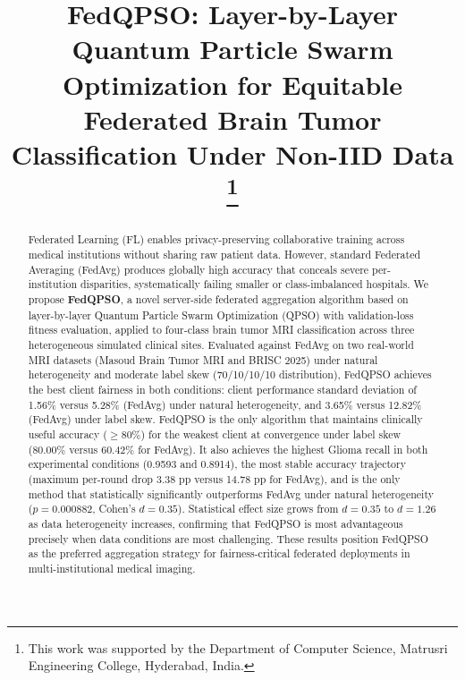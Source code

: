 \documentclass[conference]{IEEEtran}
\begin{document}

\title{FedQPSO: Layer-by-Layer Quantum Particle Swarm Optimization for
Equitable Federated Brain Tumor Classification Under Non-IID Data
\thanks{This work was supported by the Department of Computer Science,
Matrusri Engineering College, Hyderabad, India.}}

\author{%
}

\maketitle

\begin{abstract}
Federated Learning (FL) enables privacy-preserving collaborative training
across medical institutions without sharing raw patient data. However,
standard Federated Averaging (FedAvg) produces globally high accuracy that
conceals severe per-institution disparities, systematically failing smaller
or class-imbalanced hospitals. We propose \textbf{FedQPSO}, a novel
server-side federated aggregation algorithm based on layer-by-layer Quantum
Particle Swarm Optimization (QPSO) with validation-loss fitness evaluation,
applied to four-class brain tumor MRI classification across three
heterogeneous simulated clinical sites. Evaluated against FedAvg
on two real-world MRI datasets (Masoud Brain Tumor MRI and BRISC 2025) under
natural heterogeneity and moderate label skew (70/10/10/10 distribution),
FedQPSO achieves the best client fairness in both conditions: client
performance standard deviation of 1.56\% versus 5.28\%
(FedAvg) under natural heterogeneity, and 3.65\% versus 12.82\% (FedAvg) under label skew. FedQPSO is the only algorithm that
maintains clinically useful accuracy ($\geq$80\%) for the weakest client at
convergence under label skew (80.00\% versus 60.42\% for FedAvg). It also achieves the highest Glioma recall in both experimental
conditions (0.9593 and 0.8914), the most stable accuracy trajectory (maximum
per-round drop 3.38 pp versus 14.78 pp for FedAvg), and is the only method
that statistically significantly outperforms FedAvg under natural
heterogeneity ($p = 0.000882$, Cohen's $d = 0.35$). Statistical effect size
grows from $d = 0.35$ to $d = 1.26$ as data heterogeneity increases,
confirming that FedQPSO is most advantageous precisely when data conditions
are most challenging. These results position FedQPSO as the preferred
aggregation strategy for fairness-critical federated deployments in
multi-institutional medical imaging.
\end{abstract}
\end{document}
